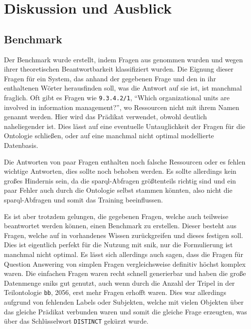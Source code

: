 \chapter{Diskussion und Ausblick}\label{ch:discussion}

\section{Benchmark}

Der Benchmark wurde erstellt, indem Fragen aus \citet{bb} genommen wurden und wegen ihrer theoretischen Beantwortbarkeit klassifiziert wurden.
Die Eignung dieser Fragen für ein System, das anhand der gegebenen Frage und den in ihr enthaltenen Wörter herausfinden soll, was die Antwort auf sie ist, ist manchmal fraglich.
Oft gibt es Fragen wie \texttt{9.3.4.2/1}, \enquote{Which organizational units are involved in information management?}, wo Ressourcen nicht mit ihrem Namen genannt werden.
Hier wird das Prädikat  verwendet, obwohl  deutlich naheliegender ist.
Dies lässt auf eine eventuelle Untauglichkeit der Fragen für die Ontologie schließen, oder auf eine manchmal nicht optimal modellierte Datenbasis.

Die Antworten von paar Fragen enthalten noch falsche Ressourcen oder es fehlen wichtige Antworten, dies sollte noch behoben werden.
Es sollte allerdings kein großes Hindernis sein, da die \ac{sparql}-Abfragen größtenteils richtig sind und ein paar Fehler auch durch die Ontologie selbst stammen könnten,
also nicht die \ac{sparql}-Abfragen und somit das Training beeinflussen.

Es ist aber trotzdem gelungen, die gegebenen Fragen, welche auch teilweise beantwortet werden können, einen Benchmark zu erstellen.
Dieser besteht aus Fragen, welche auf in \citet{bb} vorhandenes Wissen zurückgreifen und dieses festigen soll.
Dies ist eigentlich perfekt für die Nutzung mit \ac{snik}, nur die Formulierung ist manchmal nicht optimal.
Es lässt sich allerdings auch sagen, dass die Fragen für Question Answering von simplen Fragen vergleichsweise definitiv höchst komplex waren.
Die einfachen Fragen waren recht schnell generierbar und haben die große Datenmenge \ac{snik}s gut genutzt,
auch wenn durch die Anzahl der Tripel in der Teilontologie \texttt{bb}, 2056, erst mehr Fragen erhofft waren.%
Dies war allerdings aufgrund von fehlenden Labels oder Subjekten, welche mit vielen Objekten über das gleiche Prädikat verbunden waren und somit die gleiche Frage erzeugten,
was über das Schlüsselwort \texttt{DISTINCT} gekürzt wurde.

